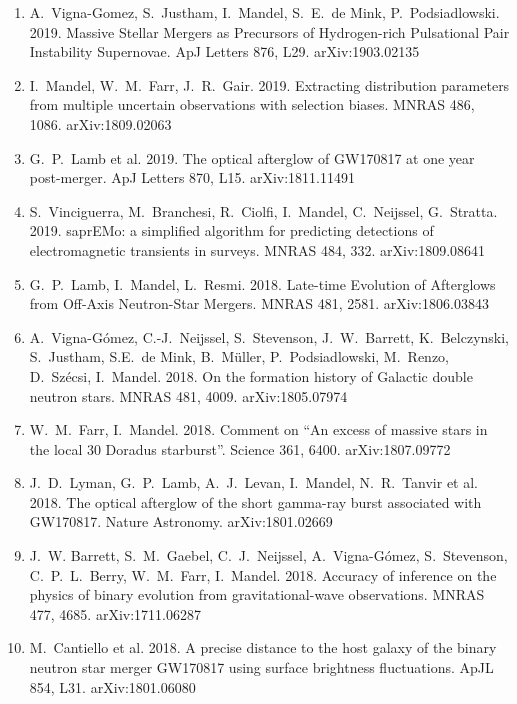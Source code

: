\documentclass[margin,line]{res}
\begin{document}
\begin{resume}
\begin{enumerate}
\item A.~Vigna-Gomez, S.~Justham, I.~Mandel, S.~E.~de Mink, P.~Podsiadlowski.  2019.  Massive Stellar Mergers as Precursors of Hydrogen-rich Pulsational Pair Instability Supernovae.  ApJ Letters 876, L29. arXiv:1903.02135

\item I.~Mandel, W.~M.~Farr, J.~R.~Gair.  2019. Extracting distribution parameters from multiple uncertain observations with selection biases.  MNRAS 486, 1086.  arXiv:1809.02063

\item G.~P.~Lamb et al. 2019. The optical afterglow of GW170817 at one year post-merger.  ApJ Letters 870, L15. arXiv:1811.11491

\item S.~Vinciguerra, M.~Branchesi, R.~Ciolfi, I.~Mandel, C.~Neijssel, G.~Stratta.  2019. saprEMo: a simplified algorithm for predicting detections of electromagnetic transients in surveys.  MNRAS 484, 332.  arXiv:1809.08641

\item G.~P.~Lamb, I.~Mandel, L.~Resmi.  2018.  Late-time Evolution of Afterglows from Off-Axis Neutron-Star Mergers.  MNRAS 481, 2581.  arXiv:1806.03843

\item A.~Vigna-G\'{o}mez, C.-J.~Neijssel, S.~Stevenson, J.~W.~Barrett, K.~Belczynski, S.~Justham, S.E.~de Mink, B.~M{\"u}ller, P.~Podsiadlowski, M.~Renzo, D.~Sz{\'e}csi, I.~Mandel.  2018. On the formation history of Galactic double neutron stars.  MNRAS 481, 4009. arXiv:1805.07974

\item W.~M.~Farr, I.~Mandel.  2018.  Comment on ``An excess of massive stars in the local 30 Doradus starburst''.  Science 361, 6400.  arXiv:1807.09772

\item J.~D.~Lyman, G.~P.~Lamb, A.~J.~Levan, I.~Mandel, N.~R.~Tanvir et al.  2018. The optical afterglow of the short gamma-ray burst associated with GW170817.  Nature Astronomy. arXiv:1801.02669

\item J.~W. Barrett, S.~M.~Gaebel, C.~J.~Neijssel, A.~Vigna-G\'{o}mez, S.~Stevenson, C.~P.~L.~Berry, W.~M.~Farr, I.~Mandel.  2018.  Accuracy of inference on the physics of binary evolution from gravitational-wave observations.   MNRAS 477, 4685.  arXiv:1711.06287

\item M.~Cantiello et al. 2018.  A precise distance to the host galaxy of the binary neutron star merger GW170817 using surface brightness fluctuations.  ApJL 854, L31.  arXiv:1801.06080


\end{enumerate}
\end{resume}
\end{document}
